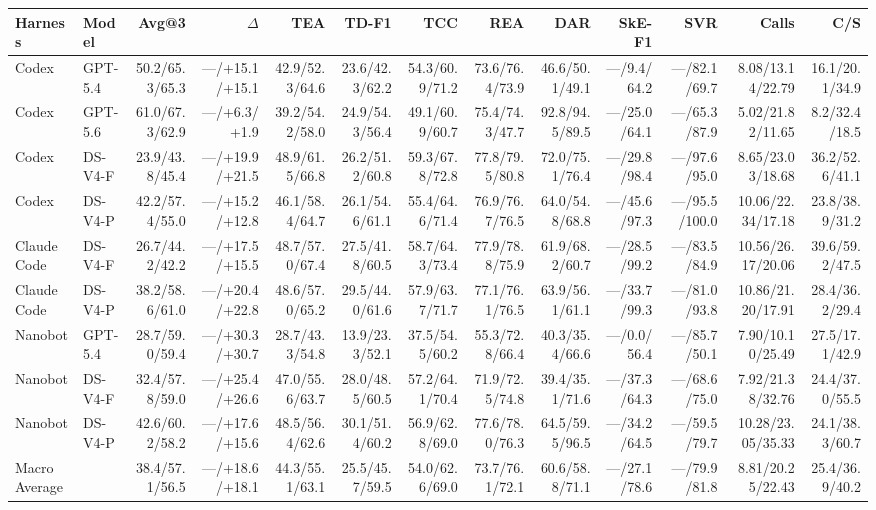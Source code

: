 \begin{tabular}{llrrrrrrrrrrr}
\toprule
Harness & Model & Avg@3 & $\Delta$ & TEA & TD-F1 & TCC & REA & DAR & SkE-F1 & SVR & Calls & C/S \\
\midrule
Codex & GPT-5.4 & 50.2/65.3/65.3 & —/+15.1/+15.1 & 42.9/52.3/64.6 & 23.6/42.3/62.2 & 54.3/60.9/71.2 & 73.6/76.4/73.9 & 46.6/50.1/49.1 & —/9.4/64.2 & —/82.1/69.7 & 8.08/13.14/22.79 & 16.1/20.1/34.9 \\
Codex & GPT-5.6 & 61.0/67.3/62.9 & —/+6.3/+1.9 & 39.2/54.2/58.0 & 24.9/54.3/56.4 & 49.1/60.9/60.7 & 75.4/74.3/47.7 & 92.8/94.5/89.5 & —/25.0/64.1 & —/65.3/87.9 & 5.02/21.82/11.65 & 8.2/32.4/18.5 \\
Codex & DS-V4-F & 23.9/43.8/45.4 & —/+19.9/+21.5 & 48.9/61.5/66.8 & 26.2/51.2/60.8 & 59.3/67.8/72.8 & 77.8/79.5/80.8 & 72.0/75.1/76.4 & —/29.8/98.4 & —/97.6/95.0 & 8.65/23.03/18.68 & 36.2/52.6/41.1 \\
Codex & DS-V4-P & 42.2/57.4/55.0 & —/+15.2/+12.8 & 46.1/58.4/64.7 & 26.1/54.6/61.1 & 55.4/64.6/71.4 & 76.9/76.7/76.5 & 64.0/54.8/68.8 & —/45.6/97.3 & —/95.5/100.0 & 10.06/22.34/17.18 & 23.8/38.9/31.2 \\
Claude Code & DS-V4-F & 26.7/44.2/42.2 & —/+17.5/+15.5 & 48.7/57.0/67.4 & 27.5/41.8/60.5 & 58.7/64.3/73.4 & 77.9/78.8/75.9 & 61.9/68.2/60.7 & —/28.5/99.2 & —/83.5/84.9 & 10.56/26.17/20.06 & 39.6/59.2/47.5 \\
Claude Code & DS-V4-P & 38.2/58.6/61.0 & —/+20.4/+22.8 & 48.6/57.0/65.2 & 29.5/44.0/61.6 & 57.9/63.7/71.7 & 77.1/76.1/76.5 & 63.9/56.1/61.1 & —/33.7/99.3 & —/81.0/93.8 & 10.86/21.20/17.91 & 28.4/36.2/29.4 \\
Nanobot & GPT-5.4 & 28.7/59.0/59.4 & —/+30.3/+30.7 & 28.7/43.3/54.8 & 13.9/23.3/52.1 & 37.5/54.5/60.2 & 55.3/72.8/66.4 & 40.3/35.4/66.6 & —/0.0/56.4 & —/85.7/50.1 & 7.90/10.10/25.49 & 27.5/17.1/42.9 \\
Nanobot & DS-V4-F & 32.4/57.8/59.0 & —/+25.4/+26.6 & 47.0/55.6/63.7 & 28.0/48.5/60.5 & 57.2/64.1/70.4 & 71.9/72.5/74.8 & 39.4/35.1/71.6 & —/37.3/64.3 & —/68.6/75.0 & 7.92/21.38/32.76 & 24.4/37.0/55.5 \\
Nanobot & DS-V4-P & 42.6/60.2/58.2 & —/+17.6/+15.6 & 48.5/56.4/62.6 & 30.1/51.4/60.2 & 56.9/62.8/69.0 & 77.6/78.0/76.3 & 64.5/59.5/96.5 & —/34.2/64.5 & —/59.5/79.7 & 10.28/23.05/35.33 & 24.1/38.3/60.7 \\
Macro Average &  & 38.4/57.1/56.5 & —/+18.6/+18.1 & 44.3/55.1/63.1 & 25.5/45.7/59.5 & 54.0/62.6/69.0 & 73.7/76.1/72.1 & 60.6/58.8/71.1 & —/27.1/78.6 & —/79.9/81.8 & 8.81/20.25/22.43 & 25.4/36.9/40.2 \\
\bottomrule
\end{tabular}
